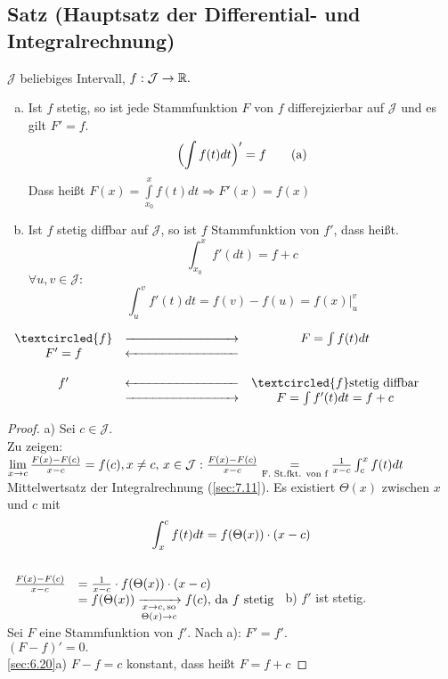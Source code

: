\subsection{Satz (Hauptsatz der Differential- und Integralrechnung)}\label{sec:8.8}
$\mathcal{J}$ beliebiges Intervall, $f : \mathcal{J}\to \mathbb{R}.$
\begin{enumerate}[a)]
\item Ist $f$ stetig, so ist jede Stammfunktion $F$ von $f$ differejzierbar auf $\mathcal{J}$ und es gilt $F' = f$.
\begin{equation}
\Bigl(\int f(t)dt\Bigr)' = f \tag{a}
\end{equation}
Dass hei\ss t $F(x) = \int\limits_{x_0}^{x} f(t)dt \Rightarrow F'(x) = f(x)$
\item Ist $f$ stetig diffbar auf $\mathcal{J}$, so ist $f$ Stammfunktion von $f'$, dass hei\ss t.
\begin{equation}
\int_{x_0}^{x} f'(dt) = f + c \tag{b}
\end{equation}
$\forall u,v \in \mathcal{J}:$
\[ \int_{u}^{v} f'(t)dt = f(v) - f(u) =f(x) \Big\vert_u^v \]
\end{enumerate}$
\begin{array}{ccc}
\textcircled{f}&\xrightarrow{\hspace*{3.cm}}& F = \int f(t)dt\\
F' = f &\xleftarrow{\hspace*{3.cm}} \\
&\\
f'&\xleftarrow{\hspace*{3.cm}} &\textcircled{f} \text{stetig diffbar}\\
& \xrightarrow{\hspace*{3.cm}}& F = \int f'(t)dt = f + c
\end{array}$
\begin{proof}
a) Sei $c \in \mathcal{J}$.\\
Zu zeigen: $\lim\limits_{x \to c} \frac{F(x)-F(c)}{x-c} =f(c), x \ne c,\,x\in\mathcal{J}:\\
\frac{F(x)-F(c)}{x-c} \underset{\text{F. St.fkt. von f}}{=} \frac{1}{x-c} \int^x_cf(t)dt$\\
Mittelwertsatz der Integralrechnung (\ref{sec:7.11}). Es existiert $\Theta(x)$ zwischen $x$ und $c$ mit 
\[ \int_{x}^{c} f(t)dt = f(\Theta(x)) \cdot (x-c) \]\\
$\begin{array}{ll}
\frac{F(x)-F(c)}{x-c} &= \frac{1}{x-c} \cdot f(\Theta(x)) \cdot (x-c)\\
&= f(\Theta(x)) \xrightarrow[\substack{x \to c,\,\text{so}\\\Theta(x) \to c}]{} f(c),\, \text{da $f$ stetig}
\end{array}$
b) $f'$ ist stetig.\\
Sei $F$ eine Stammfunktion von $f'$. Nach a): $F'=f'$.\\
$(F-f)' = 0.$\\
\ref{sec:6.20}a) $F -f =c $ konstant, dass hei\ss t $F =f+c$ 
\end{proof}
